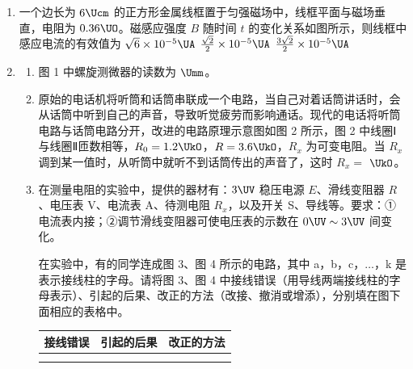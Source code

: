 \documentclass[\gkver]{gaokaozhenti}
\begin{document}
\begin{enumerate}
\item
一个边长为 $6\Ucm$ 的正方形金属线框置于匀强磁场中，线框平面与磁场垂直，电阻为 $0.36\UO$。磁感应强度 $B$ 随时间 $t$ 的变化关系如图所示，则线框中感应电流的有效值为
{$\sqrt{6}\times10^{-5}\UA$}
{$\frac{\sqrt{2}}{2}\times10^{-5}\UA$}
{$\frac{3\sqrt{2}}{2}\times10^{-5}\UA$}

\item
\begin{enumerate}
	\item
	图 1 中螺旋测微器的读数为  $\Umm$。

	\item
	原始的电话机将听筒和话筒串联成一个电路，当自己对着话筒讲话时，会从话筒中听到自己的声音，导致听觉疲劳而影响通话。现代的电话将听筒电路与话筒电路分开，改进的电路原理示意图如图 2 所示，图 2 中线圈Ⅰ与线圈Ⅱ匝数相等，$R_{0}=1.2\UkO$，$R=3.6\UkO$，$R_{x}$ 为可变电阻。当 $R_{x}$ 调到某一值时，从听筒中就听不到话筒传出的声音了，这时 $R_{x}=$  $\UkO$。

	\item
	在测量电阻的实验中，提供的器材有：$3\UV$ 稳压电源 $E$、滑线变阻器 $R$、电压表 V、电流表 A、待测电阻 $R_{x}$，以及开关 S、导线等。要求：①电流表内接；②调节滑线变阻器可使电压表的示数在 $0\UV\sim3\UV$ 间变化。

	在实验中，有的同学连成图 3、图 4 所示的电路，其中 a，b，c，$\ldots$，k 是表示接线柱的字母。请将图 3、图 4 中接线错误（用导线两端接线柱的字母表示）、引起的后果、改正的方法（改接、撤消或增添），分别填在图下面相应的表格中。


	\begin{center}
	\begin{tabular}{|c|c|c|}
	\hline
	接线错误 & 引起的后果 & 改正的方法 \\ \hline
	 & & \\ \hline
	 & & \\ \hline
	\end{tabular}
	\end{center}


\end{enumerate}
\end{enumerate}
\end{document}
